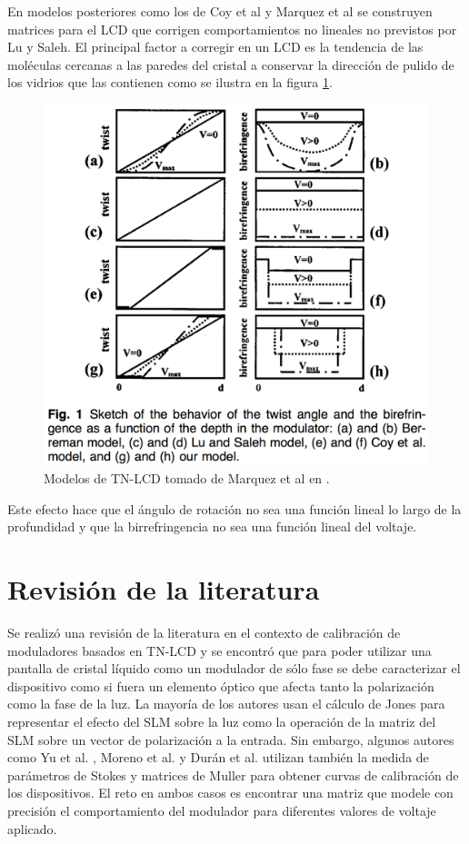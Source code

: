 En modelos posteriores como los de Coy et al  y Marquez
et al  se construyen matrices para el LCD que corrigen
comportamientos no lineales no previstos por  Lu y Saleh. El
principal factor a corregir en un LCD es la tendencia de las moléculas
cercanas a las paredes del cristal a conservar la dirección de pulido
de los vidrios que las contienen como se ilustra en la figura \ref{fig:lcd_models}.
\begin{figure}[h!]
\centering
\includegraphics[scale=.5]{lcd_models}
\caption[Modelos de TN-LCD]{Modelos de TN-LCD tomado de Marquez et al en .}
\label{fig:lcd_models}
\end{figure}
 Este efecto hace que el ángulo de
rotación no sea una función lineal  lo largo de la profundidad y que la
birrefringencia no sea una función lineal del voltaje.


\section{Revisión de la literatura}
Se realizó una revisión de la literatura en el contexto de calibración
de moduladores basados en TN-LCD y se encontró que para poder utilizar
una pantalla de cristal líquido como un modulador de sólo fase se debe
caracterizar el dispositivo como si fuera un elemento óptico que
afecta tanto la polarización como la fase de la luz. La mayoría de los
autores usan el cálculo de Jones para representar el efecto del SLM
sobre la luz como la operación de la matriz del SLM sobre un vector de
polarización a la entrada. Sin embargo, algunos autores como Yu et al.  , Moreno et
al.  y Durán et al.  utilizan también
la medida de parámetros de  Stokes y matrices de Muller para obtener
curvas de calibración de los dispositivos. El reto en ambos casos es
encontrar una matriz que 
modele con precisión el comportamiento del modulador para diferentes
valores de voltaje aplicado. 



